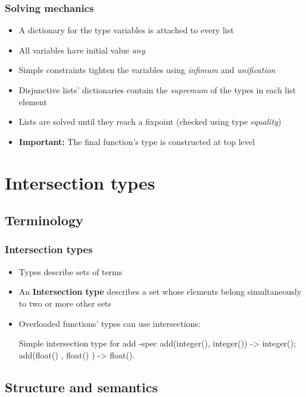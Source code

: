 \documentclass{beamer}
\begin{document}
\begin{frame}
  \frametitle{Solving mechanics}
  \begin{itemize}
  \item A dictionary for the type variables is attached to every
    list
  \item All variables have initial value \emph{any} \pause
  \item Simple constraints tighten the variables using \emph{infimum}
    and \emph{unification} \pause
  \item Disjunctive lists' dictionaries contain the \emph{supremum} of
    the types in each list element \pause
  \item Lists are solved until they reach a fixpoint (checked using
    type \emph{equality}) \pause
  \item \textbf{Important:} The final function's type is constructed
    at top level
  \end{itemize}
\end{frame}

\section{Intersection types}

\subsection{Terminology}

\begin{frame}[fragile]
  \frametitle{Intersection types}
  \begin{itemize}
  \item Types describe sets of terms \pause
  \item An \textbf{Intersection type} describes a set whose elements
    belong simultaneously to two or more other sets \pause
  \item Overloaded functions' types can use intersections:
    \begin{code}{Simple intersection type for add}
-spec add(integer(), integer()) -> integer();
      add(float()  , float()  ) -> float().
    \end{code}
  \end{itemize}
\end{frame}

\subsection{Structure and semantics}
\end{document}
